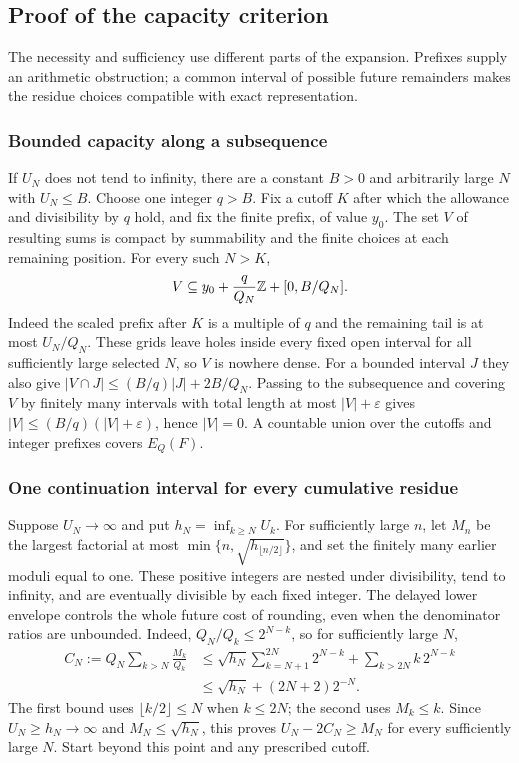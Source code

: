 \documentclass[11pt]{article}
\begin{document}
\subsection{Proof of the capacity criterion}\label{capacity:sec:capacity-proof}
The necessity and sufficiency use different parts of the expansion. Prefixes
supply an arithmetic obstruction; a common interval of possible future
remainders makes the residue choices compatible with exact representation.

\subsubsection{Bounded capacity along a subsequence}
If $U_N$ does not tend to infinity, there are a constant $B>0$ and arbitrarily
large $N$ with $U_N\le B$. Choose one integer $q>B$. Fix a cutoff $K$ after
which the allowance and divisibility by $q$ hold, and fix the finite prefix,
of value $y_0$. The set $V$ of resulting sums is compact by summability and
the finite choices at each remaining position. For every such $N>K$,
\[
 V\subseteq y_0+\frac q{Q_N}\mathbb{Z}+[0,B/Q_N].
\]
Indeed the scaled prefix after $K$ is a multiple of $q$ and the remaining
tail is at most $U_N/Q_N$. These grids leave holes inside every fixed open
interval for all sufficiently large selected $N$, so $V$ is nowhere dense.
For a bounded interval $J$ they also give
$|V\cap J|\le(B/q)|J|+2B/Q_N$.
Passing to the subsequence and covering $V$ by finitely many intervals with
total length at most $|V|+\varepsilon$ gives
$|V|\le(B/q)(|V|+\varepsilon)$, hence $|V|=0$.
A countable union over the cutoffs and integer prefixes covers $E_Q(F)$.

\subsubsection{One continuation interval for every cumulative residue}
Suppose $U_N\to\infty$ and put $h_N=\inf_{k\ge N}U_k$. For sufficiently
large $n$, let $M_n$ be the largest factorial at most
$\min\{n,\sqrt{h_{\lfloor n/2\rfloor}}\}$, and set the finitely many
earlier moduli equal to one. These positive integers are nested under
divisibility, tend to infinity, and are eventually divisible by each fixed
integer. The delayed lower envelope controls the whole future cost of
rounding, even when the denominator ratios are unbounded. Indeed,
$Q_N/Q_k\le2^{N-k}$, so for sufficiently large $N$,
\[
 \begin{aligned}
 C_N:=Q_N\sum_{k>N}\frac{M_k}{Q_k}
 &\le\sqrt{h_N}\sum_{k=N+1}^{2N}2^{N-k}
       +\sum_{k>2N}k\,2^{N-k}\\
 &\le\sqrt{h_N}+(2N+2)2^{-N}.
 \end{aligned}
\]
The first bound uses $\lfloor k/2\rfloor\le N$ when $k\le2N$; the second
uses $M_k\le k$. Since $U_N\ge h_N\to\infty$ and
$M_N\le\sqrt{h_N}$, this proves $U_N-2C_N\ge M_N$ for every sufficiently
large $N$. Start beyond this point and any prescribed cutoff.
\end{document}

